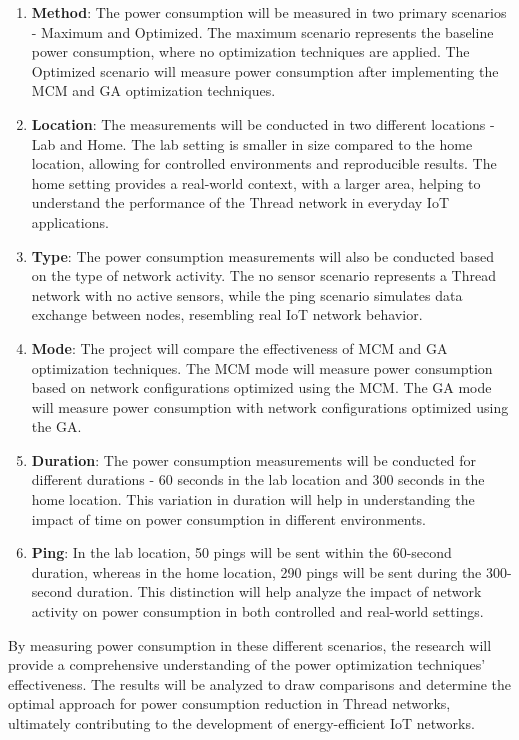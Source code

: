 \begin{enumerate}
  \item \textbf{Method}: The power consumption will be measured in two primary scenarios - Maximum and Optimized. The maximum scenario represents the baseline power consumption, where no optimization techniques are applied. The Optimized scenario will measure power consumption after implementing the \gls{MCM} and \gls{GA} optimization techniques.
  \item \textbf{Location}: The measurements will be conducted in two different locations - Lab and Home. The lab setting is smaller in size compared to the home location, allowing for controlled environments and reproducible results. The home setting provides a real-world context, with a larger area, helping to understand the performance of the Thread network in everyday \gls{IoT} applications.
  \item \textbf{Type}: The power consumption measurements will also be conducted based on the type of network activity. The no sensor scenario represents a Thread network with no active sensors, while the ping scenario simulates data exchange between nodes, resembling real IoT network behavior.
  \item \textbf{Mode}: The project will compare the effectiveness of \gls{MCM} and \gls{GA} optimization techniques. The \gls{MCM} mode will measure power consumption based on network configurations optimized using the \gls{MCM}. The \gls{GA} mode will measure power consumption with network configurations optimized using the \gls{GA}.
  \item \textbf{Duration}: The power consumption measurements will be conducted for different durations - 60 seconds in the lab location and 300 seconds in the home location. This variation in duration will help in understanding the impact of time on power consumption in different environments.
  \item \textbf{Ping}: In the lab location, 50 pings will be sent within the 60-second duration, whereas in the home location, 290 pings will be sent during the 300-second duration. This distinction will help analyze the impact of network activity on power consumption in both controlled and real-world settings.
\end{enumerate}

By measuring power consumption in these different scenarios, the research will provide a comprehensive understanding of the power optimization techniques' effectiveness. The results will be analyzed to draw comparisons and determine the optimal approach for power consumption reduction in Thread networks, ultimately contributing to the development of energy-efficient \gls{IoT} networks.

